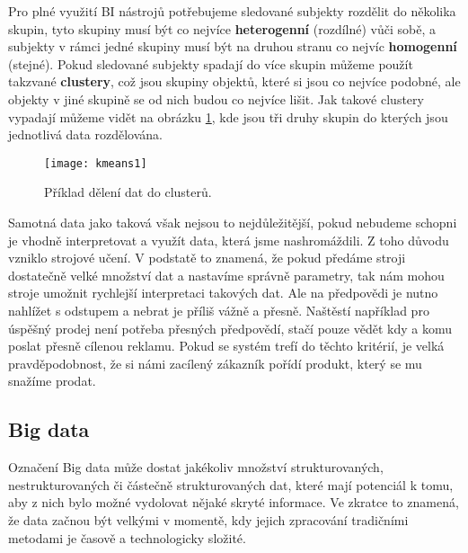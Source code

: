 \par Pro plné využití BI nástrojů potřebujeme sledované subjekty rozdělit do několika skupin, tyto skupiny musí být co nejvíce \textbf{heterogenní} (rozdílné) vůči sobě, a subjekty v rámci jedné skupiny musí být na druhou stranu co nejvíc \textbf{homogenní} (stejné). Pokud sledované subjekty spadají do více skupin můžeme použít takzvané \textbf{clustery}, což jsou skupiny objektů, které si jsou co nejvíce podobné, ale objekty v jiné skupině se od nich budou co nejvíce lišit. \cite{data-science-business} Jak takové clustery vypadají můžeme vidět na obrázku \ref{cluster-fig}, kde jsou tři druhy skupin do kterých jsou jednotlivá data rozdělována.

\begin{figure}[htp]
\centering
\texttt{[image: kmeans1]}
\caption{Příklad dělení dat do clusterů.}
\label{cluster-fig}
\end{figure}

\par Samotná data jako taková však nejsou to nejdůležitější, pokud nebudeme schopni je vhodně interpretovat a využít data, která jsme nashromáždili. Z toho důvodu vzniklo strojové učení. V podstatě to znamená, že pokud předáme stroji dostatečně velké množství dat a nastavíme správně parametry, tak nám mohou stroje umožnit rychlejší interpretaci takových dat. Ale na předpovědi je nutno nahlížet s odstupem a nebrat je příliš vážně a přesně. Naštěstí například pro úspěšný prodej není potřeba přesných předpovědí, stačí pouze vědět kdy a komu poslat přesně cílenou reklamu. Pokud se systém trefí do těchto kritérií, je velká pravděpodobnost, že si námi zacílený zákazník pořídí produkt, který se mu snažíme prodat. \cite{predictive-analytics}

\subsection{Big data} \label{big-data}
\par Označení Big data může dostat jakékoliv množství strukturovaných, nestrukturovaných či částečně strukturovaných dat, které mají potenciál k tomu, aby z nich bylo možné vydolovat nějaké skryté informace. Ve zkratce to znamená, že data začnou být velkými v momentě, kdy jejich zpracování tradičními metodami je časově a technologicky složité.\cite{big-data-anayitics}

